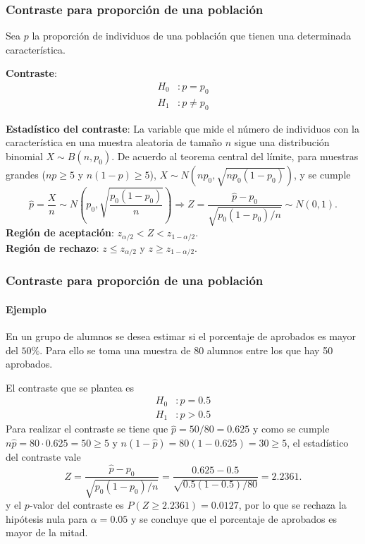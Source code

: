 \begin{frame}
\frametitle{Contraste para proporción de una población}
Sea $p$ la proporción de individuos de una población que tienen una determinada característica.

\textbf{Contraste}:
\begin{align*}
H_0 &: p=p_0\\
H_1 &: p\neq p_0
\end{align*}

\textbf{Estadístico del contraste}: La variable que mide el número de individuos con la característica en una muestra aleatoria de tamaño $n$ sigue una distribución binomial $X\sim B(n,p_0)$. De acuerdo al teorema central del límite, para muestras grandes ($np\geq 5$ y $n(1-p)\geq 5$), $X\sim N(np_0,\sqrt{np_0(1-p_0)})$, y se cumple
\[
\hat{p}=\frac{X}{n} \sim N\left(p_0,\sqrt{\frac{p_0(1-p_0)}{n}}\right) \Rightarrow Z = \frac{\hat
p-p_0}{\sqrt{p_0(1-p_0)/n}}\sim N(0,1).
\]
\textbf{Región de aceptación}: $z_{\alpha/2}< Z < z_{1-\alpha/2}$.\\
\textbf{Región de rechazo}: $z\leq z_{\alpha/2}$ y $z\geq z_{1-\alpha/2}$.
\end{frame}


\begin{frame}
\frametitle{Contraste para proporción de una población}
\framesubtitle{Ejemplo}
En un grupo de alumnos se desea estimar si el porcentaje de aprobados es mayor del $50\%$.
Para ello se toma una muestra de 80 alumnos entre los que hay 50 aprobados.

El contraste que se plantea es
\begin{align*}
H_0 &: p=0.5\\
H_1 &: p>0.5
\end{align*}
Para realizar el contraste se tiene que $\hat p= 50/80 = 0.625$ y como se cumple $n\hat p=80\cdot 0.625 = 50\geq 5$ y $n(1-\hat p)=80(1-0.625)=30\geq 5$, el estadístico del contraste vale
\[
Z = \frac{\hat p-p_0}{\sqrt{p_0(1-p_0)/n}} = \frac{0.625-0.5}{\sqrt{0.5(1-0.5)/80}} = 2.2361.
\]
y el $p$-valor del contraste es $P(Z\geq 2.2361)=0.0127$, por lo que se rechaza la hipótesis nula para $\alpha=0.05$ y se concluye que el porcentaje de aprobados es mayor de la mitad.
\end{frame}


